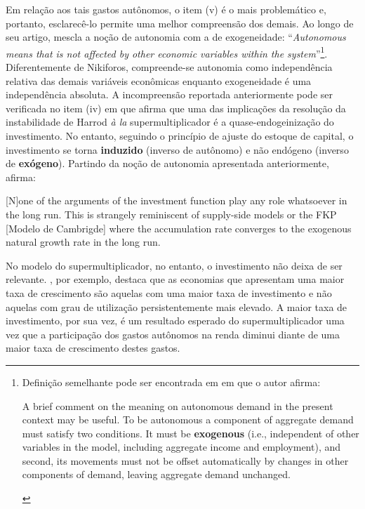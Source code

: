 Em relação aos tais gastos autônomos, o item (v) é o mais problemático e, portanto, esclarecê-lo permite uma melhor compreensão dos demais. Ao longo de seu artigo, \textcite[p.~4]{nikiforos_comments_2018} mescla a noção de autonomia com a de exogeneidade: ``\textit{Autonomous means that is not affected by other economic variables within the system}''\footnote{
	Definição semelhante pode ser encontrada em \textcite[p.~2, grifos adicionados]{skott_autonomous_2017} em que o autor afirma:
	\begin{citacao}
		A brief comment on the meaning on autonomous demand in the present context may be useful. To
		be autonomous a component of aggregate demand must satisfy two conditions. It must be \textbf{exogenous}
		(i.e., independent of other variables in the model, including aggregate income and employment), and
		second, its movements must not be offset automatically by changes in other components of demand,
		leaving aggregate demand unchanged.
	\end{citacao}	
}. Diferentemente de Nikiforos, compreende-se autonomia como independência relativa das demais variáveis econômicas enquanto exogeneidade é uma independência absoluta. 
A incompreensão reportada anteriormente pode ser verificada no item (iv) em que afirma que uma das implicações da resolução da instabilidade de Harrod \textit{à la} supermultiplicador é a quase-endogeinização do investimento. No entanto, seguindo o princípio de ajuste do estoque de capital, o investimento se torna \textbf{induzido} (inverso de autônomo) e não endógeno (inverso de \textbf{exógeno}). Partindo da noção de autonomia apresentada anteriormente, \citeauthor*{nikiforos_comments_2018} afirma:
\begin{citacao}
	
	[N]one of the arguments of the investment function play any role whatsoever in the long run. This is strangely
	reminiscent of supply-side models or the FKP [Modelo de Cambrigde] where the accumulation rate converges to the
	exogenous natural growth rate in the long run. \cite[p.~11--12, comentario adicionado]{nikiforos_comments_2018}
\end{citacao}
No modelo do supermultiplicador, no entanto, o investimento não deixa de ser relevante. \textcite{dejuan_hidden_2017}, por exemplo, destaca que as economias que apresentam uma maior taxa de crescimento são aquelas com uma maior taxa de investimento e não aquelas com grau de utilização persistentemente mais elevado. A maior taxa de investimento, por sua vez, é um resultado esperado do supermultiplicador uma vez que a participação dos gastos autônomos na renda diminui diante de uma maior taxa de crescimento destes gastos.

